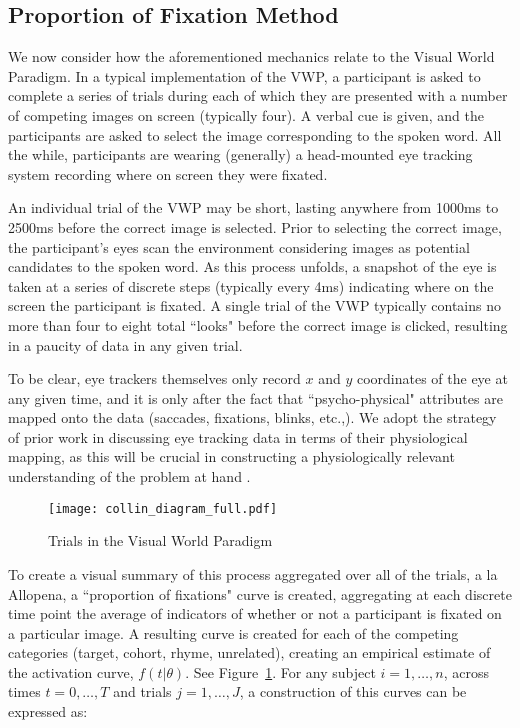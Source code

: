 \subsection{Proportion of Fixation Method}


We now consider how the aforementioned mechanics relate to the Visual World Paradigm. In a typical implementation of the VWP, a participant is asked to complete a series of trials during each of which they are presented with a number of competing images on screen (typically four). A verbal cue is given, and the participants are asked to select the image corresponding to the spoken word. All the while, participants are wearing (generally) a head-mounted eye tracking system recording where on screen they were fixated. 

An individual trial of the VWP may be short, lasting anywhere from 1000ms to 2500ms before the correct image is selected. Prior to selecting the correct image, the participant's eyes scan the environment considering images as potential candidates to the spoken word. As this process unfolds, a snapshot of the eye is taken at a series of discrete steps (typically every 4ms) indicating where on the screen the participant is fixated. A single trial of the VWP typically contains no more than four to eight total ``looks" before the correct image is clicked, resulting in a paucity of data in any given trial.

To be clear, eye trackers themselves only record $x$ and $y$ coordinates of the eye at any given time, and it is only after the fact that ``psycho-physical" attributes are mapped onto the data (saccades, fixations, blinks, etc.,). We adopt the strategy of prior work in discussing eye tracking data in terms of their physiological mapping, as this will be crucial in constructing a physiologically relevant understanding of the problem at hand \citep{mcmurray2002look}.

\begin{figure}[H]
\centering
\texttt{[image: collin\_diagram\_full.pdf]}
\caption{Trials in the Visual World Paradigm}
\label{fig:collin_diagram_full}
\end{figure}


To create a visual summary of this process aggregated over all of the trials, a la Allopena, a ``proportion of fixations" curve is created, aggregating at each discrete time point the average of indicators of whether or not a participant is fixated on a particular image. A resulting curve is created for each of the competing categories (target, cohort, rhyme, unrelated), creating an empirical estimate of the activation curve, $f(t|\theta)$. See Figure~\ref{fig:collin_diagram_full}. For any subject $i = 1, \dots, n$, across times $t = 0, \dots, T$ and trials $j = 1, \dots, J$, a construction  of this curves can be expressed as:



